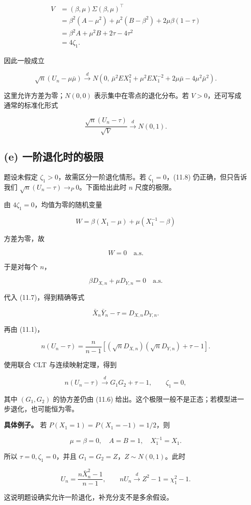\[
\begin{aligned}
V
&=(\beta,\mu)\Sigma(\beta,\mu)^\top\\
&=\beta^2(A-\mu^2)+\mu^2(B-\beta^2)+2\mu\beta(1-\tau)\\
&=\beta^2A+\mu^2B+2\tau-4\tau^2\\
&=4\zeta_1.
\end{aligned}
\]

因此一般成立

\[
\boxed{
\sqrt n(U_n-\mu\bar\mu)
\xrightarrow d
N\left(0,\,
\bar\mu^2EX_1^2+\mu^2EX_1^{-2}
+2\mu\bar\mu-4\mu^2\bar\mu^2\right).}
\tag{11.8}
\]

这里允许方差为零；$N(0,0)$ 表示集中在零点的退化分布。若 $V>0$，还可写成通常的标准化形式

\[
\boxed{\frac{\sqrt n(U_n-\tau)}{\sqrt V}\xrightarrow dN(0,1).}
\]

\subsection{(e) 一阶退化时的极限}

题设未假定 $\zeta_1>0$，故需区分一阶退化情形。若 $\zeta_1=0$，(11.8) 仍正确，但只告诉我们 $\sqrt n(U_n-\tau)\to_P0$。下面给出此时 $n$ 尺度的极限。

由 $4\zeta_1=0$，均值为零的随机变量

\[
W=\beta(X_1-\mu)+\mu(X_1^{-1}-\beta)
\]

方差为零，故

\[
W=0\quad\text{a.s.}
\]

于是对每个 $n$，

\[
\beta D_{X,n}+\mu D_{Y,n}=0\quad\text{a.s.}
\]

代入 (11.7)，得到精确等式

\[
\bar X_n\bar Y_n-\tau=D_{X,n}D_{Y,n}.
\]

再由 (11.1)，

\[
n(U_n-\tau)
=\frac n{n-1}
\left[(\sqrt n D_{X,n})(\sqrt n D_{Y,n})+\tau-1\right].
\]

使用联合 CLT 与连续映射定理，得到

\[
\boxed{n(U_n-\tau)\xrightarrow dG_1G_2+\tau-1,\qquad \zeta_1=0,}
\tag{11.9}
\]

其中 $(G_1,G_2)$ 的协方差仍由 (11.6) 给出。这个极限一般不是正态；若模型进一步退化，也可能恒为零。

\textbf{具体例子。} 若 $P(X_1=1)=P(X_1=-1)=1/2$，则

\[
\mu=\beta=0,\quad A=B=1,\quad X_1^{-1}=X_1.
\]

所以 $\tau=0,\zeta_1=0$，并且 $G_1=G_2=Z$，$Z\sim N(0,1)$。此时

\[
U_n=\frac{n\bar X_n^2-1}{n-1},
\qquad
\boxed{nU_n\xrightarrow d Z^2-1=\chi_1^2-1.}
\]

这说明题设确实允许一阶退化，补充分支不是多余假设。
